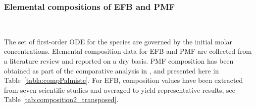 \documentclass[preprint,12pt]{elsarticle}
\begin{document}
\subsubsection{Elemental compositions of EFB and PMF}
\label{Initial Conditions for EFB and PMF Combustion}\\

The set of first-order ODE for the species are governed by the initial molar concentrations. Elemental composition data for EFB and PMF are collected from a literature review and reported on a dry basis. PMF composition has been obtained as part of the comparative analysis in \cite{Idris2012}, and presented here in Table~\ref{tabla:compPalmiste}. For EFB, composition values have been extracted from seven scientific studies and averaged to yield representative results, see Table \ref{tab:composition2_transposed}.\\ 
\end{document}
